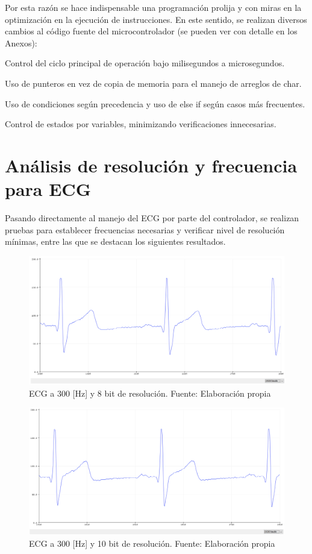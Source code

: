 Por esta razón se hace indispensable una programación prolija y con miras en la optimización en la ejecución de instrucciones. En este sentido, se realizan diversos cambios al código fuente del microcontrolador (se pueden ver con detalle en los Anexos):

Control del ciclo principal de operación bajo milisegundos a microsegundos.

Uso de punteros en vez de copia de memoria para el manejo de arreglos de char.

Uso de condiciones según precedencia y uso de else if según casos más frecuentes.

Control de estados por variables, minimizando verificaciones innecesarias.

\newpage

\section{Análisis de resolución y frecuencia para ECG}

Pasando directamente al manejo del ECG por parte del controlador, se realizan pruebas para establecer frecuencias necesarias y verificar nivel de resolución mínimas, entre las que se destacan los siguientes resultados.

\begin{figure}[H]
	\centering
	\includegraphics[scale=0.4]{figuras/proto2/8bit.png}
	\caption{ECG a 300 [Hz] y 8 bit de resolución. Fuente: Elaboración propia}
	\label{8bit}
\end{figure}

\begin{figure}[H]
	\centering
	\includegraphics[scale=0.4]{figuras/proto2/10bit.png}
	\caption{ECG a 300 [Hz] y 10 bit de resolución. Fuente: Elaboración propia}
	\label{10bit}
\end{figure}

